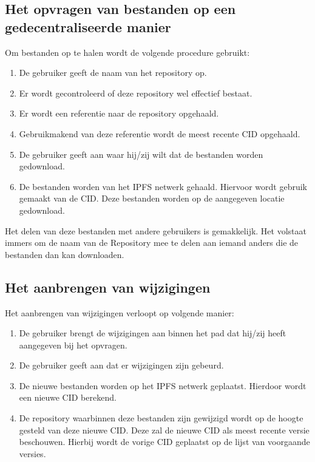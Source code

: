 \subsection{Het opvragen van bestanden op een gedecentraliseerde manier}
Om bestanden op te halen wordt de volgende procedure gebruikt:

\begin{enumerate}
\item De gebruiker geeft de naam van het repository op.\\
\item Er wordt gecontroleerd of deze repository wel effectief bestaat.\\
\item Er wordt een referentie naar de repository opgehaald.\\
\item Gebruikmakend van deze referentie wordt de meest recente CID opgehaald.\\
\item De gebruiker geeft aan waar hij/zij wilt dat de bestanden worden gedownload.
\item De bestanden worden van het IPFS netwerk gehaald. Hiervoor wordt gebruik gemaakt van de CID. Deze bestanden worden op de aangegeven locatie gedownload.
\end{enumerate}

Het delen van deze bestanden met andere gebruikers is gemakkelijk. Het volstaat immers om de naam van de Repository mee te delen aan iemand anders die de bestanden dan kan downloaden.
\subsection{Het aanbrengen van wijzigingen}
Het aanbrengen van wijzigingen verloopt op volgende manier:

\begin{enumerate}
\item De gebruiker brengt de wijzigingen aan binnen het pad dat hij/zij heeft aangegeven bij het opvragen.
\item De gebruiker geeft aan dat er wijzigingen zijn gebeurd.
\item De nieuwe bestanden worden op het IPFS netwerk geplaatst. Hierdoor wordt een nieuwe CID berekend.
\item De repository waarbinnen deze bestanden zijn gewijzigd wordt op de hoogte gesteld van deze nieuwe CID. Deze zal de nieuwe CID als meest recente versie beschouwen. Hierbij wordt de vorige CID geplaatst op de lijst van voorgaande versies.
\end{enumerate}

